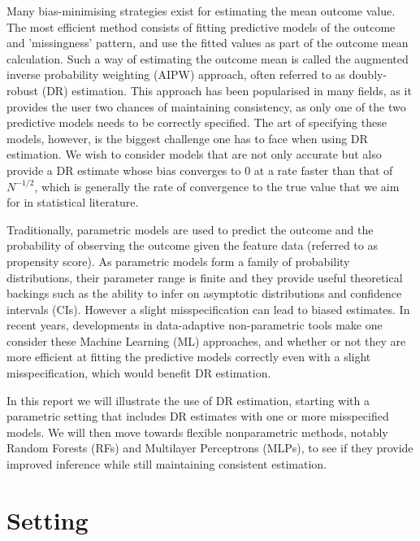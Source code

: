 \documentclass[12pt,twoside]{article}
\begin{document}
Many bias-minimising strategies exist for estimating the mean outcome value. The most efficient method consists of fitting predictive models of the outcome and 'missingness' pattern, and use the fitted values as part of the outcome mean calculation. Such a way of estimating the outcome mean is called the augmented inverse probability weighting (AIPW) approach, often referred to as doubly-robust (DR) estimation. This approach has been popularised in many fields, as it provides the user two chances of maintaining consistency, as only one of the two predictive models needs to be correctly specified. The art of specifying these models, however, is the biggest challenge one has to face when using DR estimation. We wish to consider models that are not only accurate but also provide a DR estimate whose bias converges to 0 at a rate faster than that of $N^{-1/2}$, which is generally the rate of convergence to the true value that we aim for in statistical literature.

Traditionally, parametric models are used to predict the outcome and the probability of observing the outcome given the feature data (referred to as propensity score). As parametric models form a family of probability distributions, their parameter range is finite and they provide useful theoretical backings such as the ability to infer on asymptotic distributions and confidence intervals (CIs). However a slight misspecification can lead to biased estimates. In recent years, developments in data-adaptive non-parametric tools make one consider these Machine Learning (ML) approaches, and whether or not they are more efficient at fitting the predictive models correctly even with a slight misspecification, which would benefit DR estimation.
 
In this report we will illustrate the use of DR estimation, starting with a parametric setting that includes DR estimates with one or more misspecified models. We will then move towards flexible nonparametric methods, notably Random Forests (RFs) and Multilayer Perceptrons (MLPs), to see if they provide improved inference while still maintaining consistent estimation.

\clearpage 
\section{Setting} 
\end{document}
